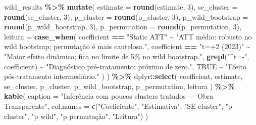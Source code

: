 \documentclass[
]{article}
\newenvironment{Shaded}{\begin{snugshade}}{\end{snugshade}}
\newcommand{\AttributeTok}[1]{\textcolor[rgb]{0.13,0.29,0.53}{#1}}
\newcommand{\ConstantTok}[1]{\textcolor[rgb]{0.56,0.35,0.01}{#1}}
\newcommand{\DecValTok}[1]{\textcolor[rgb]{0.00,0.00,0.81}{#1}}
\newcommand{\FunctionTok}[1]{\textcolor[rgb]{0.13,0.29,0.53}{\textbf{#1}}}
\newcommand{\NormalTok}[1]{#1}
\newcommand{\SpecialCharTok}[1]{\textcolor[rgb]{0.81,0.36,0.00}{\textbf{#1}}}
\newcommand{\StringTok}[1]{\textcolor[rgb]{0.31,0.60,0.02}{#1}}
\begin{document}
\begin{Shaded}
\begin{Highlighting}[]
\NormalTok{wild\_results }\SpecialCharTok{\%\textgreater{}\%}
  \FunctionTok{mutate}\NormalTok{(}
    \AttributeTok{estimate =} \FunctionTok{round}\NormalTok{(estimate, }\DecValTok{3}\NormalTok{),}
    \AttributeTok{se\_cluster =} \FunctionTok{round}\NormalTok{(se\_cluster, }\DecValTok{3}\NormalTok{),}
    \AttributeTok{p\_cluster =} \FunctionTok{round}\NormalTok{(p\_cluster, }\DecValTok{3}\NormalTok{),}
    \AttributeTok{p\_wild\_bootstrap =} \FunctionTok{round}\NormalTok{(p\_wild\_bootstrap, }\DecValTok{3}\NormalTok{),}
    \AttributeTok{p\_permutation =} \FunctionTok{round}\NormalTok{(p\_permutation, }\DecValTok{3}\NormalTok{),}
    \AttributeTok{leitura =} \FunctionTok{case\_when}\NormalTok{(}
\NormalTok{      coefficient }\SpecialCharTok{==} \StringTok{"Static ATT"} \SpecialCharTok{\textasciitilde{}} \StringTok{"ATT médio: robusto no wild bootstrap; permutação é mais cautelosa."}\NormalTok{,}
\NormalTok{      coefficient }\SpecialCharTok{==} \StringTok{"t=+2 (2023)"} \SpecialCharTok{\textasciitilde{}} \StringTok{"Maior efeito dinâmico; fica no limite de 5\% no wild bootstrap."}\NormalTok{,}
      \FunctionTok{grepl}\NormalTok{(}\StringTok{"\^{}t={-}"}\NormalTok{, coefficient) }\SpecialCharTok{\textasciitilde{}} \StringTok{"Diagnóstico pré{-}tratamento: próximo de zero."}\NormalTok{,}
      \ConstantTok{TRUE} \SpecialCharTok{\textasciitilde{}} \StringTok{"Efeito pós{-}tratamento intermediário."}
\NormalTok{    )}
\NormalTok{  ) }\SpecialCharTok{\%\textgreater{}\%}
\NormalTok{  dplyr}\SpecialCharTok{::}\FunctionTok{select}\NormalTok{(}
\NormalTok{    coefficient,}
\NormalTok{    estimate,}
\NormalTok{    se\_cluster,}
\NormalTok{    p\_cluster,}
\NormalTok{    p\_wild\_bootstrap,}
\NormalTok{    p\_permutation,}
\NormalTok{    leitura}
\NormalTok{  ) }\SpecialCharTok{\%\textgreater{}\%}
  \FunctionTok{kable}\NormalTok{(}
    \AttributeTok{caption =} \StringTok{"Inferência com poucos clusters tratados — Obra Transparente"}\NormalTok{,}
    \AttributeTok{col.names =} \FunctionTok{c}\NormalTok{(}\StringTok{"Coeficiente"}\NormalTok{, }\StringTok{"Estimativa"}\NormalTok{, }\StringTok{"SE cluster"}\NormalTok{, }\StringTok{"p cluster"}\NormalTok{, }\StringTok{"p wild"}\NormalTok{, }\StringTok{"p permutação"}\NormalTok{, }\StringTok{"Leitura"}\NormalTok{)}
\NormalTok{  )}
\end{Highlighting}
\end{Shaded}
\end{document}
